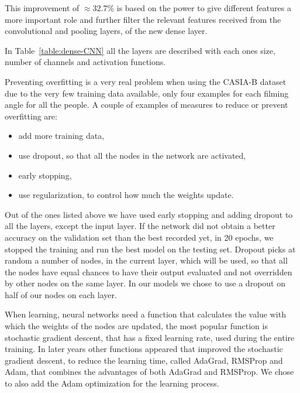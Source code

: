 \documentclass[12pt]{article}
\theoremstyle{definition}
\begin{document}
	This improvement of $\approx 32.7\%$ is based on the power to give different features a more important role and further filter the relevant features received from the convolutional and pooling layers, of the new dense layer.

	In Table~\ref{table:dense-CNN} all the layers are described with each ones size, number of channels and activation functions.

	Preventing overfitting is a very real problem when using the CASIA-B dataset \cite{casia1}\cite{casia2}\cite{casia3} due to the very few training data available, only four examples for each filming angle for all the people. A couple of examples of measures to reduce or prevent overfitting are:
	\begin{itemize}
		\item add more training data,
		\item use dropout, so that all the nodes in the network are activated,
		\item early stopping,
		\item use regularization, to control how much the weights update.
	\end{itemize}

	Out of the ones listed above we have used early stopping and adding dropout to all the layers, except the input layer. If the network did not obtain a better accuracy on the validation set than the best recorded yet, in 20 epochs, we stopped the training and run the best model on the testing set. Dropout picks at random a number of nodes, in the current layer, which will be used, so that all the nodes have equal chances to have their output evaluated and not overridden by other nodes on the same layer. In our models we chose to use a dropout on half of our nodes on each layer.

	When learning, neural networks need a function that calculates the value with which the weights of the nodes are updated, the most popular function is stochastic gradient descent, that has a fixed learning rate, used during the entire training. In later years other functions appeared that improved the stochastic gradient descent, to reduce the learning time, called AdaGrad, RMSProp and Adam, that combines the advantages of both AdaGrad and RMSProp.
	We chose to also add the Adam optimization for the learning process.
\end{document}
